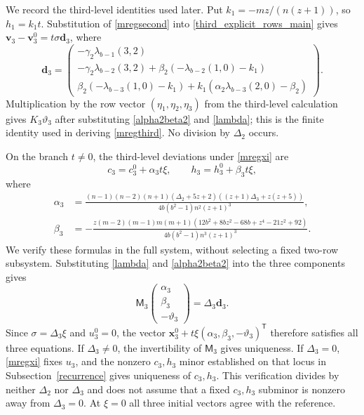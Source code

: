 \documentclass[12pt]{article}
\theoremstyle{remark}
\begin{document}
We record the third-level identities used later.  Put
$k_1=-mz/(n(z+1))$, so $h_1=k_1t$.  Substitution of
\eqref{mregsecond} into \eqref{third_explicit_rows_main} gives
$\mathbf v_3-\mathbf v_3^0=t\sigma\mathbf d_3$, where
\[
\mathbf d_3=
\begin{pmatrix}
 -\gamma_2\lambda_{b-1}(3,2)\\
 -\gamma_2\lambda_{b-2}(3,2)
       +\beta_2(-\lambda_{b-2}(1,0)-k_1)\\
 \beta_2(-\lambda_{b-3}(1,0)-k_1)
       +k_1(\alpha_2\lambda_{b-3}(2,0)-\beta_2)
\end{pmatrix}.
\]
Multiplication by the row vector $(\eta_1,\eta_2,\eta_3)$ from the
third-level calculation gives $K_3\vartheta_3$ after substituting
\eqref{alpha2beta2} and \eqref{lambda}; this is the finite identity used
in deriving \eqref{mregthird}.  No division by $\Delta_2$ occurs.

On the branch $t\ne0$, the third-level deviations under
\eqref{mregxi} are
\begin{equation}\label{c3h3regular}
 c_3=c_3^0+\alpha_3t\xi,\qquad
 h_3=h_3^0+\beta_3t\xi,
\end{equation}
where
\begin{equation}\label{alpha3beta3}
\begin{aligned}
 \alpha_3&=\frac{(n-1)(n-2)(n+1)(\Delta_2+5z+2)
                   ((z+1)\Delta_3+z(z+5))}
                   {4b(b^2-1)n^2(z+1)^3},\\
 \beta_3&=-\frac{z(m-2)(m-1)m(m+1)
             (12b^2+8bz^2-68b+z^4-21z^2+92)}
             {4b(b^2-1)n^3(z+1)^3}.
\end{aligned}
\end{equation}
We verify these formulas in the full system, without selecting a fixed
two-row subsystem.  Substituting \eqref{lambda} and
\eqref{alpha2beta2} into the three components gives
\begin{equation*}
 \mathsf M_3
 \begin{pmatrix}\alpha_3\\\beta_3\\-\vartheta_3\end{pmatrix}
 =\Delta_3\mathbf d_3.
\end{equation*}
Since $\sigma=\Delta_3\xi$ and $u_3^0=0$, the vector
$\mathbf x_3^0+t\xi(\alpha_3,\beta_3,-\vartheta_3)^{\mathsf T}$
therefore satisfies all three equations.  If $\Delta_3\ne0$, the
invertibility of $\mathsf M_3$ gives uniqueness.  If $\Delta_3=0$,
\eqref{mregxi} fixes $u_3$, and the nonzero $c_3,h_3$ minor established
on that locus in Subsection~\ref{recurrence} gives uniqueness of
$c_3,h_3$.  This verification divides by neither $\Delta_2$ nor $\Delta_3$ and
does not assume that a fixed $c_3,h_3$ subminor is nonzero away from
$\Delta_3=0$.  At $\xi=0$ all three initial vectors agree with the reference.
\end{document}
